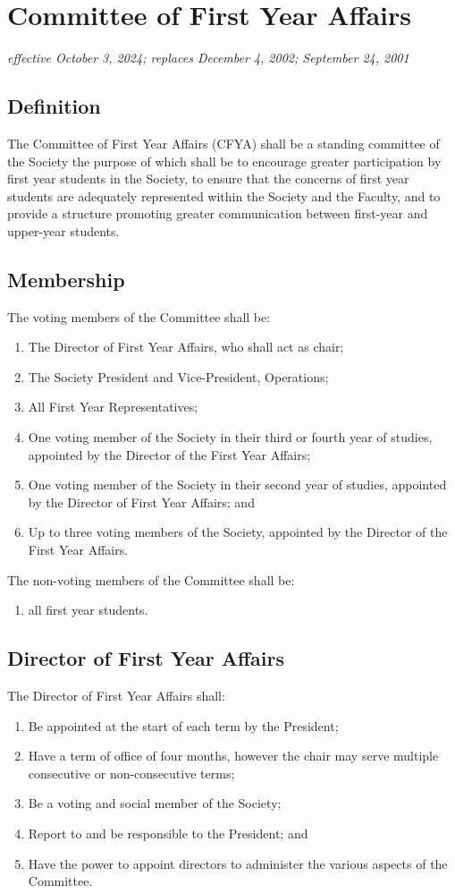 \section{Committee of First Year Affairs}
\emph{effective October 3, 2024; replaces December 4, 2002; September 24, 2001}

\subsection{Definition}
The Committee of First Year Affairs (CFYA) shall be a standing committee of the Society the purpose of which shall be to encourage greater participation by first year students in the Society, to ensure that the concerns of first year students are adequately represented within the Society and the Faculty, and to provide a structure promoting greater communication between first-year and upper-year students.

\subsection{Membership}
The voting members of the Committee shall be:
\begin{enumerate}
\item The Director of First Year Affairs, who shall act as chair;
\item The Society President and Vice-President, Operations;
\item All First Year Representatives;
\item One voting member of the Society in their third or fourth year of studies, appointed by the Director of the First Year Affairs;
\item One voting member of the Society in their second year of studies, appointed by the Director of First Year Affairs; and
\item Up to three voting members of the Society, appointed by the Director of the First Year Affairs.
\end{enumerate}
The non-voting members of the Committee shall be:
\begin{enumerate}
\item all first year students.
\end{enumerate}

\subsection{Director of First Year Affairs}
The Director of First Year Affairs shall:
\begin{enumerate}
\item Be appointed at the start of each term by the President;
\item Have a term of office of four months, however the chair may serve multiple consecutive or non-consecutive terms;
\item Be a voting and social member of the Society;
\item Report to and be responsible to the President; and
\item Have the power to appoint directors to administer the various aspects of the Committee.
\end{enumerate}
